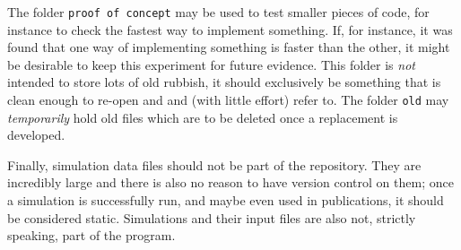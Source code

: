 \documentclass[10pt,a4paper]{article}
\begin{document}
The folder \verb$proof of concept$ may be used to test smaller pieces of code, for instance to check the fastest way to implement something. If, for instance, it was found that one way of implementing something is faster than the other, it might be desirable to keep this experiment for future evidence. This folder is \emph{not} intended to store lots of old rubbish, it should exclusively be something that is clean enough to re-open and and (with little effort) refer to. The folder \verb$old$ may \emph{temporarily} hold old files which are to be deleted once a replacement is developed.

Finally, simulation data files should not be part of the repository. They are incredibly large and there is also no reason to have version control on them; once a simulation is successfully run, and maybe even used in publications, it should be considered static. Simulations and their input files are also not, strictly speaking, part of the program.
\end{document}
